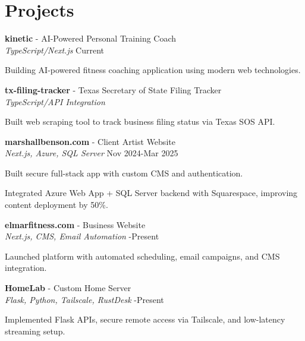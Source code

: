 \documentclass[letterpaper,10pt]{article}
\newcommand{\resumeItem}[1]{\item \small{#1}}
\begin{document}
\section*{Projects}
\begin{compactitem}
  \item[]
    \textbf{kinetic} - AI-Powered Personal Training Coach \\
    \textit{TypeScript/Next.js} \hbarfill Current
    \begin{compactitem}
      \resumeItem{Building AI-powered fitness coaching application using modern web technologies.}
    \end{compactitem}

  \item[]
    \textbf{tx-filing-tracker} - Texas Secretary of State Filing Tracker \\
    \textit{TypeScript/API Integration} 
    \begin{compactitem}
      \resumeItem{Built web scraping tool to track business filing status via Texas SOS API.}
    \end{compactitem}

  \item[]
    \textbf{marshallbenson.com} - Client Artist Website \\
    \textit{Next.js, Azure, SQL Server} \hbarfill Nov 2024-Mar 2025
    \begin{compactitem}
      \resumeItem{Built secure full-stack app with custom CMS and authentication.}
      \resumeItem{Integrated Azure Web App + SQL Server backend with Squarespace, improving content deployment by 50\%.}
    \end{compactitem}

  \item[]
    \textbf{elmarfitness.com} - Business Website \\
    \textit{Next.js, CMS, Email Automation} -Present
    \begin{compactitem}
      \resumeItem{Launched platform with automated scheduling, email campaigns, and CMS integration.}
    \end{compactitem}

  \item[]
    \textbf{HomeLab} - Custom Home Server \\
    \textit{Flask, Python, Tailscale, RustDesk} -Present
    \begin{compactitem}
      \resumeItem{Implemented Flask APIs, secure remote access via Tailscale, and low-latency streaming setup.}
    \end{compactitem}
\end{compactitem}
\end{document}
